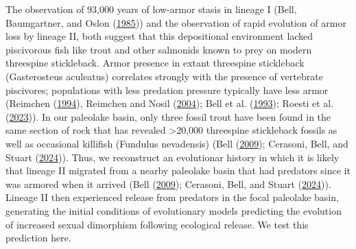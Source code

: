 \documentclass[
  12pt,
]{article}
\begin{document}
The observation of 93,000 years of low-armor stasis in lineage I (Bell,
Baumgartner, and Oslon (\protect\hyperlink{ref-Belletal1985}{1985})) and
the observation of rapid evolution of armor loss by lineage II, both
suggest that this depositional environment lacked piscivorous fish like
trout and other salmonids known to prey on modern threespine
stickleback. Armor presence in extant threespine stickleback
(Gasterosteus aculeatus) correlates strongly with the presence of
vertebrate piscivores; populations with less predation pressure
typically have less armor (Reimchen
(\protect\hyperlink{ref-Reimchen1994}{1994}), Reimchen and Nosil
(\protect\hyperlink{ref-ReimchenandNosil2004}{2004}); Bell et al.
(\protect\hyperlink{ref-Belletal1993}{1993}); Roesti et al.
(\protect\hyperlink{ref-Roestietal2023}{2023})). In our paleolake basin,
only three fossil trout have been found in the same section of rock that
has revealed \textgreater20,000 threespine stickleback fossils as well
as occasional killifish (Fundulus nevadensis) (Bell
(\protect\hyperlink{ref-Bell2009}{2009}); Cerasoni, Bell, and Stuart
(\protect\hyperlink{ref-Cerasonietal2024}{2024})). Thus, we reconstruct
an evolutionar history in which it is likely that lineage II migrated
from a nearby paleolake basin that had predators since it was armored
when it arrived (Bell (\protect\hyperlink{ref-Bell2009}{2009});
Cerasoni, Bell, and Stuart
(\protect\hyperlink{ref-Cerasonietal2024}{2024})). Lineage II then
experienced release from predators in the focal paleolake basin,
generating the initial conditions of evolutionary models predicting the
evolution of increased sexual dimorphism following ecological release.
We test this prediction here.
\end{document}
